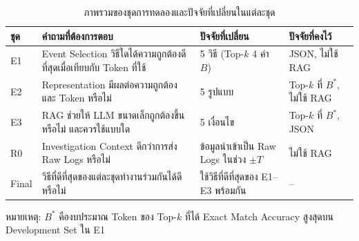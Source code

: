 \begin{table}[ht]
  \centering
  \caption{ภาพรวมของชุดการทดลองและปัจจัยที่เปลี่ยนในแต่ละชุด}
  \label{tab:exp-design}
  \small
  \begin{tabular}{|l|L{0.3\textwidth}|L{0.25\textwidth}|L{0.2\textwidth}|}
    \hline
    \textbf{ชุด} & \textbf{คำถามที่ต้องการตอบ} & \textbf{ปัจจัยที่เปลี่ยน} & \textbf{ปัจจัยที่คงไว้} \\ \hline
    E1 & Event Selection วิธีใดได้ความถูกต้องดีที่สุดเมื่อเทียบกับ Token ที่ใช้ & 5 วิธี (Top-$k$ 4 ค่า $B$) & JSON, ไม่ใช้ RAG \\ \hline
    E2 & Representation มีผลต่อความถูกต้องและ Token หรือไม่ & 5 รูปแบบ & Top-$k$ ที่ $B^{*}$, ไม่ใช้ RAG \\ \hline
    E3 & RAG ช่วยให้ LLM ขนาดเล็กถูกต้องขึ้นหรือไม่ และควรใช้แบบใด & 5 เงื่อนไข & Top-$k$ ที่ $B^{*}$, JSON \\ \hline
    R0 & Investigation Context ดีกว่าการส่ง Raw Logs หรือไม่ & ข้อมูลนำเข้าเป็น Raw Logs ในช่วง $\pm T$ & ไม่ใช้ RAG \\ \hline
    Final & วิธีที่ดีที่สุดของแต่ละชุดทำงานร่วมกันได้ดีหรือไม่ & ใช้วิธีที่ดีที่สุดของ E1--E3 พร้อมกัน & -- \\ \hline
  \end{tabular}

  \vspace{1mm}
  {\footnotesize หมายเหตุ: $B^{*}$ คืองบประมาณ Token ของ Top-$k$ ที่ได้ Exact Match Accuracy สูงสุดบน Development Set ใน E1\par}
\end{table}

